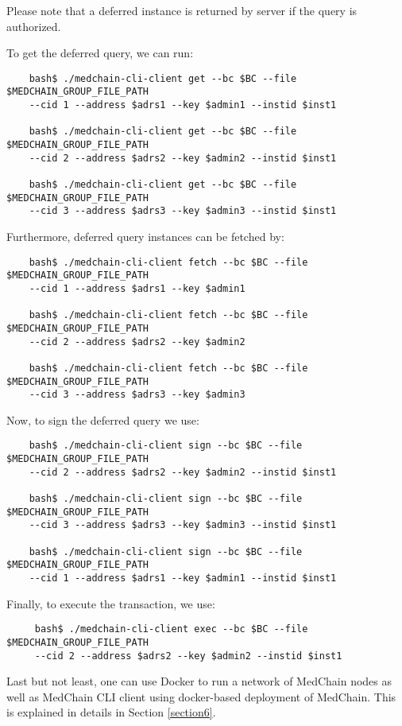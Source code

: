 Please note that a deferred instance is returned by server if the query is authorized. 

To get the deferred query, we can run:

\begin{verbatim}
    bash$ ./medchain-cli-client get --bc $BC --file $MEDCHAIN_GROUP_FILE_PATH 
    --cid 1 --address $adrs1 --key $admin1 --instid $inst1
    
    bash$ ./medchain-cli-client get --bc $BC --file $MEDCHAIN_GROUP_FILE_PATH
    --cid 2 --address $adrs2 --key $admin2 --instid $inst1

    bash$ ./medchain-cli-client get --bc $BC --file $MEDCHAIN_GROUP_FILE_PATH  
    --cid 3 --address $adrs3 --key $admin3 --instid $inst1
\end{verbatim}

Furthermore, deferred query instances can be fetched by:
 
\begin{verbatim}
    bash$ ./medchain-cli-client fetch --bc $BC --file $MEDCHAIN_GROUP_FILE_PATH
    --cid 1 --address $adrs1 --key $admin1 

    bash$ ./medchain-cli-client fetch --bc $BC --file $MEDCHAIN_GROUP_FILE_PATH  
    --cid 2 --address $adrs2 --key $admin2
    
    bash$ ./medchain-cli-client fetch --bc $BC --file $MEDCHAIN_GROUP_FILE_PATH
    --cid 3 --address $adrs3 --key $admin3 

\end{verbatim} 

Now, to sign the deferred query we use:

\begin{verbatim}
    bash$ ./medchain-cli-client sign --bc $BC --file $MEDCHAIN_GROUP_FILE_PATH
    --cid 2 --address $adrs2 --key $admin2 --instid $inst1
    
    bash$ ./medchain-cli-client sign --bc $BC --file $MEDCHAIN_GROUP_FILE_PATH
    --cid 3 --address $adrs3 --key $admin3 --instid $inst1
    
    bash$ ./medchain-cli-client sign --bc $BC --file $MEDCHAIN_GROUP_FILE_PATH  
    --cid 1 --address $adrs1 --key $admin1 --instid $inst1
\end{verbatim}
 
 Finally, to execute the transaction, we use:
 
 \begin{verbatim}
     bash$ ./medchain-cli-client exec --bc $BC --file $MEDCHAIN_GROUP_FILE_PATH
     --cid 2 --address $adrs2 --key $admin2 --instid $inst1
 \end{verbatim}

Last but not least, one can use Docker to run a network of MedChain nodes as well as MedChain CLI client using docker-based deployment of MedChain. This is explained in details in Section \ref{section6}.  
